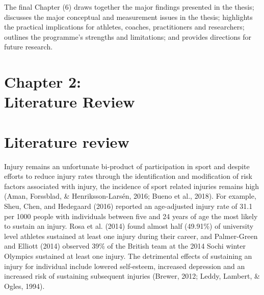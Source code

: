 \documentclass[man,floatsintext]{apa6}
\begin{document}
The final Chapter (6) draws together the major findings presented in the thesis; discusses the major conceptual and measurement issues in the thesis; highlights the practical implications for athletes, coaches, practitioners and researchers; outlines the programme's strengths and limitations; and provides directions for future research.

\clearpage

\vspace*{3cm}

\section[Chapter 2: Literature review]{\Large{Chapter 2: \\ Literature Review}}

\clearpage

\hypertarget{literature-review}{%
\section{Literature review}\label{literature-review}}

Injury remains an unfortunate bi-product of participation in sport and despite efforts to reduce injury rates through the identification and modification of risk factors associated with injury,
the incidence of sport related injuries remains high (Aman, Forssblad, \& Henriksson-Larsén, 2016; Bueno et al., 2018).
For example, Sheu, Chen, and Hedegaard (2016) reported an age-adjusted injury rate of 31.1 per 1000 people with individuals between five and 24 years of age the most likely to sustain an injury.
Rosa et al. (2014) found almost half (49.91\%) of university level athletes sustained at least one injury during their career, and Palmer-Green and Elliott (2014) observed 39\% of the British team at the 2014 Sochi winter Olympics sustained at least one injury.
The detrimental effects of sustaining an injury for individual include lowered self-esteem, increased depression and an increased risk of sustaining subsequent injuries (Brewer, 2012; Leddy, Lambert, \& Ogles, 1994).
\end{document}
